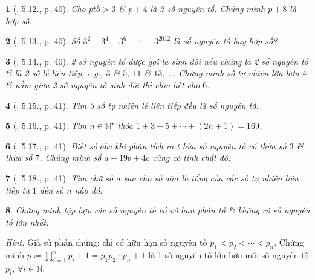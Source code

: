 \documentclass{article}
\newtheorem{baitoan}{}
\begin{document}
\begin{baitoan}[\cite{Binh_boi_duong_Toan_6_tap_1}, 5.12., p. 40]
	Cho $ptố > 3$ \& $p + 4$ là 2 số nguyên tố. Chứng minh $p + 8$ là hợp số.
\end{baitoan}

\begin{baitoan}[\cite{Binh_boi_duong_Toan_6_tap_1}, 5.13., p. 40]
	Số $3^2 + 3^4 + 3^6 + \cdots + 3^{2012}$ là số nguyên tố hay hợp số?
\end{baitoan}

\begin{baitoan}[\cite{Binh_boi_duong_Toan_6_tap_1}, 5.14., p. 40]
	2 số nguyên tố được gọi là {\rm sinh đôi} nếu chúng là 2 số nguyên tố \& là 2 số lẻ liên tiếp, e.g., $3$ \& $5$, $11$ \& $13,\ldots$. Chứng minh số tự nhiên lớn hơn $4$ \& nằm giữa 2 số nguyên tố sinh đôi thì chia hết cho $6$.
\end{baitoan}

\begin{baitoan}[\cite{Binh_boi_duong_Toan_6_tap_1}, 5.15., p. 41]
	Tìm 3 số tự nhiên lẻ liên tiếp đều là số nguyên tố.
\end{baitoan}

\begin{baitoan}[\cite{Binh_boi_duong_Toan_6_tap_1}, 5.16., p. 41]
	Tìm $n\in\mathbb{N}^\star$ thỏa $1 + 3 + 5 + \cdots + (2n + 1) = 169$.
\end{baitoan}

\begin{baitoan}[\cite{Binh_boi_duong_Toan_6_tap_1}, 5.17., p. 41]
	Biết số $\overline{abc}$ khi phân tích ra t hừa số nguyên tố có thừa số $3$ \& thừa số $7$. Chứng minh số $a + 19b + 4c$ cũng có tính chất đó.
\end{baitoan}

\begin{baitoan}[\cite{Binh_boi_duong_Toan_6_tap_1}, 5.18., p. 41]
	Tìm chữ số $a$ sao cho số $\overline{aaa}$ là tổng của các số tự nhiên liên tiếp từ $1$ đến số $n$ nào đó.
\end{baitoan}

\begin{baitoan}
	Chứng minh tập hợp các số nguyên tố có vô hạn phần tử \& không có số nguyên tố lớn nhất.
\end{baitoan}
\noindent\textit{Hint.} Giả sử phản chứng: chỉ có hữu hạn số nguyên tố $p_1 < p_2 < \cdots < p_n$. Chứng minh $p\coloneqq\prod_{i=1}^n p_i + 1 = p_1p_2\cdots p_n + 1$ là 1 số nguyên tố lớn hơn mỗi số nguyên tố $p_i$, $\forall i\in\mathbb{N}$.
\end{document}
